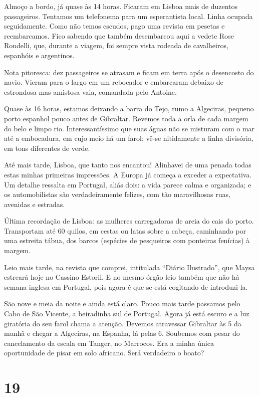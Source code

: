 Almoço a bordo, já quase às 14 horas. Ficaram em Lisboa mais de duzentos passageiros. Tentamos um telefonema para um esperantista local. Linha ocupada seguidamente. Como não temos escudos, pago uma revista em pesetas e reembarcamos. Fico sabendo que também desembarcou aqui a vedete Rose Rondelli, que, durante a viagem, foi sempre vista rodeada de cavalheiros, espanhóis e argentinos.

Nota pitoresca: dez passageiros se atrasam e ficam em terra após o desencosto do navio. Vieram para o largo em um rebocador e embarcaram debaixo de estrondosa mas amistosa vaia, comandada pelo Antoine.

Quase às 16 horas, estamos deixando a barra do Tejo, rumo a Algeciras, pequeno porto espanhol pouco antes de Gibraltar. Revemos toda a orla de cada margem do belo e limpo rio. Interessantíssimo que suas águas não se misturam com o mar até a embocadura, em cujo meio há um farol; vê-se nitidamente a linha divisória, em tons diferentes de verde.

Até mais tarde, Lisboa, que tanto nos encantou! Alinhavei de uma penada todas estas minhas primeiras impressões. A Europa já começa a exceder a expectativa. Um detalhe ressalta em Portugal, aliás dois: a vida parece calma e organizada; e os automobilistas são verdadeiramente felizes, com tão maravilhosas ruas, avenidas e estradas.

Última recordação de Lisboa: as mulheres carregadoras de areia do cais do porto. Transportam até 60 quilos, em cestas ou latas sobre a cabeça, caminhando por uma estreita tábua, dos barcos (espécies de pesqueiros com ponteiras fenícias) à margem.

Leio mais tarde, na revista que comprei, intitulada ``Diário Ilustrado'', que Maysa estreará hoje no Cassino Estoril. E no mesmo órgão leio também que não há semana inglesa em Portugal, pois agora é que se está cogitando de introduzi-la.

São nove e meia da noite e ainda está claro. Pouco mais tarde passamos pelo Cabo de São Vicente, a beiradinha sul de Portugal. Agora já está escuro e a luz giratória do seu farol chama a atenção. Devemos atravessar Gibraltar às 5 da manhã e chegar a Algeciras, na Espanha, lá pelas 6. Soubemos com pesar do cancelamento da escala em Tanger, no Marrocos. Era a minha única oportunidade de pisar em solo africano. Será verdadeiro o boato?

\section*{19 \adfflatleafright {}}

